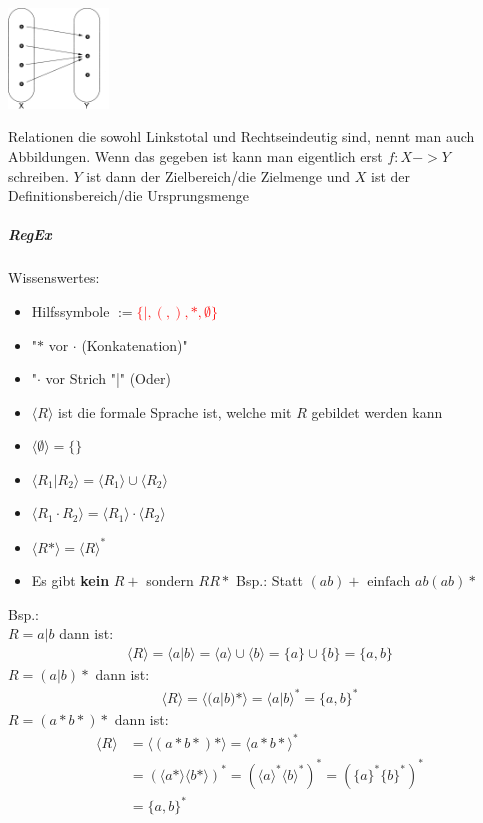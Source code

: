 \documentclass[12pt]{article}
\begin{document}
\begin{flushleft}
\begin{itemize}
        \includegraphics[width=0.2\textwidth]{linkstotal.png}
    \end{itemize}
    Relationen die sowohl Linkstotal und Rechtseindeutig sind, nennt man auch Abbildungen. Wenn das gegeben ist kann man eigentlich erst $f: X -> Y$ schreiben.
    $Y$ ist dann der Zielbereich/die Zielmenge und $X$ ist der Definitionsbereich/die Ursprungsmenge
\end{flushleft}
\large\subparagraph{\large RegEx}
\normalsize
\begin{flushleft}
    Wissenswertes:
    \begin{itemize}
        \item Hilfssymbole $:=$\textcolor{red}{$\{|,(,),\ast,\emptyset\}$}
        \item "$\ast$ vor $\cdot$ (Konkatenation)"
        \item "$\cdot$ vor Strich "|" (Oder)
        \item $\langle R \rangle$ ist die formale Sprache ist, welche mit $R$ gebildet werden kann
        \item $\langle \emptyset \rangle = \{\}$
        \item $\langle R_1| R_2 \rangle = \langle R_1 \rangle \cup \langle R_2 \rangle$
        \item $\langle R_1 \cdot R_2 \rangle =\langle R_1 \rangle \cdot \langle R_2 \rangle$
        \item $\langle R \ast \rangle = \langle R \rangle ^\ast$
        \item Es gibt \textbf{kein} $R+$ sondern $RR\ast$ Bsp.: Statt $(ab)+ \text{ einfach } ab(ab)\ast$
    \end{itemize}
    Bsp.: \\
    $R = a|b$ dann ist:
    \begin{align*}
        \langle R \rangle = \langle a | b \rangle = \langle a \rangle \cup \langle b \rangle = \{a\} \cup \{b\} = \{a,b\}
    \end{align*}
    $R = (a|b)\ast$ dann ist:
    \begin{align*}
        \langle R \rangle = \langle (a|b)\ast \rangle = \langle a | b \rangle^\ast = \{a,b\}^\ast
    \end{align*}
    $R = (a\ast b\ast)\ast$ dann ist:
    \begin{align*}
        \langle R \rangle &= \langle (a\ast b\ast)\ast \rangle = \langle a\ast b\ast\rangle^\ast \\
        &= (\langle a\ast\rangle\langle b\ast\rangle)^\ast = (\langle a\rangle^\ast\langle b\rangle^\ast)^\ast = (\{a\}^\ast\{b\}^\ast)^\ast \\
        &= \{a,b\}^\ast
    \end{align*}
\end{flushleft}
\end{document}
